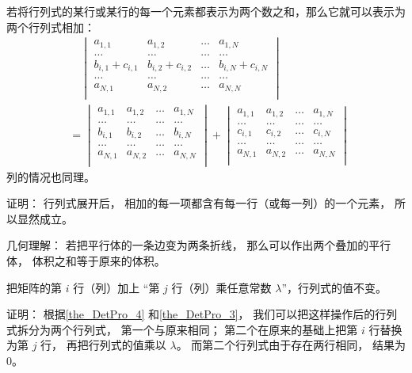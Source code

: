 \begin{theorem}{}\label{the_DetPro_4}
若将行列式的某行或某行的每一个元素都表示为两个数之和，那么它就可以表示为两个行列式相加：
\begin{equation}\label{eq_DetPro_1}
\begin{aligned}
&\quad\begin{vmatrix}
a_{1,1} & a_{1,2} & \dots & a_{1,N}\\
\dots & \dots & \dots & \dots\\
b_{i,1} + c_{i,1} & b_{i, 2} + c_{i, 2} & \dots & b_{i,N} + c_{i,N}\\
\dots & \dots & \dots & \dots\\
a_{N,1} & a_{N,2} & \dots & a_{N,N}\\
\end{vmatrix}\\
&=
\begin{vmatrix}
a_{1,1} & a_{1,2} & \dots & a_{1,N}\\
\dots & \dots & \dots & \dots\\
b_{i,1} & b_{i, 2} & \dots & b_{i,N}\\
\dots & \dots & \dots & \dots\\
a_{N,1} & a_{N,2} & \dots & a_{N,N}\\
\end{vmatrix}
+
\begin{vmatrix}
a_{1,1} & a_{1,2} & \dots & a_{1,N}\\
\dots & \dots & \dots & \dots\\
c_{i,1} & c_{i, 2} & \dots & c_{i,N}\\
\dots & \dots & \dots & \dots\\
a_{N,1} & a_{N,2} & \dots & a_{N,N}\\
\end{vmatrix}
\end{aligned}~
\end{equation}
列的情况也同理。
\end{theorem}
证明： 行列式展开后， 相加的每一项都含有每一行（或每一列）的一个元素， 所以显然成立。

几何理解： 若把平行体的一条边变为两条折线， 那么可以作出两个叠加的平行体， 体积之和等于原来的体积。

\begin{theorem}{ }\label{the_DetPro_5}
把矩阵的第 $i$ 行（列）加上 “第 $j$ 行（列）乘任意常数 $\lambda$”，行列式的值不变。
\end{theorem}
证明： 根据\autoref{the_DetPro_4} 和\autoref{the_DetPro_3}， 我们可以把这样操作后的行列式拆分为两个行列式， 第一个与原来相同； 第二个在原来的基础上把第 $i$ 行替换为第 $j$ 行， 再把行列式的值乘以 $\lambda$。 而第二个行列式由于存在两行相同， 结果为 0。

